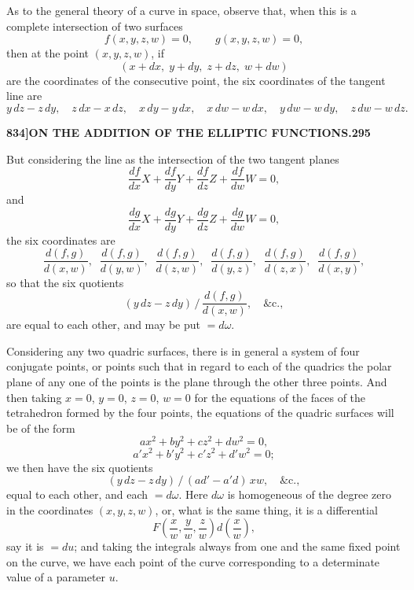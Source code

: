 \documentclass[11pt]{article}
\begin{document}
\medskip

As to the general theory of a curve in space, observe that, when this is a complete intersection of two surfaces
\[
f(x, y, z, w) = 0,\qquad g(x, y, z, w) = 0,
\]
then at the point $(x, y, z, w)$, if
\[
(x + dx,\; y + dy,\; z + dz,\; w + dw)
\]
are the coordinates of the consecutive point, the six coordinates of the tangent line are
\[
y\,dz - z\,dy,\quad z\,dx - x\,dz,\quad x\,dy - y\,dx,\quad x\,dw - w\,dx,\quad y\,dw - w\,dy,\quad z\,dw - w\,dz.
\]

\newpage

\noindent\textbf{834]}\hfill\textbf{ON THE ADDITION OF THE ELLIPTIC FUNCTIONS.}\hfill\textbf{295}

\bigskip

\noindent But considering the line as the intersection of the two tangent planes
\[
\frac{df}{dx}X + \frac{df}{dy}Y + \frac{df}{dz}Z + \frac{df}{dw}W = 0,
\]
and
\[
\frac{dg}{dx}X + \frac{dg}{dy}Y + \frac{dg}{dz}Z + \frac{dg}{dw}W = 0,
\]
the six coordinates are
\[
\frac{d(f,g)}{d(x,w)},\;\; \frac{d(f,g)}{d(y,w)},\;\; \frac{d(f,g)}{d(z,w)},\;\; \frac{d(f,g)}{d(y,z)},\;\; \frac{d(f,g)}{d(z,x)},\;\; \frac{d(f,g)}{d(x,y)},
\]
so that the six quotients
\[
(y\,dz - z\,dy)\,\bigg/\,\frac{d(f,g)}{d(x,w)},\quad \&\text{c.},
\]
are equal to each other, and may be put $= d\omega$.

\medskip

Considering any two quadric surfaces, there is in general a system of four conjugate points, or points such that in regard to each of the quadrics the polar plane of any one of the points is the plane through the other three points. And then taking $x = 0$, $y = 0$, $z = 0$, $w = 0$ for the equations of the faces of the tetrahedron formed by the four points, the equations of the quadric surfaces will be of the form
\[
ax^{2} + by^{2} + cz^{2} + dw^{2} = 0,
\]
\[
a'x^{2} + b'y^{2} + c'z^{2} + d'w^{2} = 0;
\]
we then have the six quotients
\[
(y\,dz - z\,dy)\,\big/\,(ad' - a'd)\,xw,\quad \&\text{c.},
\]
equal to each other, and each $= d\omega$. Here $d\omega$ is homogeneous of the degree zero in the coordinates $(x, y, z, w)$, or, what is the same thing, it is a differential
\[
F\!\left(\frac{x}{w},\frac{y}{w},\frac{z}{w}\right)\!d\!\left(\frac{x}{w}\right),
\]
say it is $= du$; and taking the integrals always from one and the same fixed point on the curve, we have each point of the curve corresponding to a determinate value of a parameter $u$.

\medskip
\end{document}
